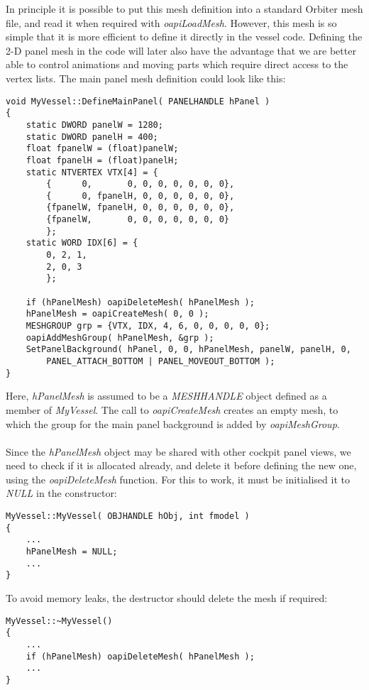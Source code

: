 \documentclass[Orbiter Developer Manual.tex]{subfiles}
\begin{document}
\noindent
In principle it is possible to put this mesh definition into a standard Orbiter mesh file, and read it when required with \textit{oapiLoadMesh}. However, this mesh is so simple that it is more efficient to define it directly in the vessel code. Defining the 2-D panel mesh in the code will later also have the advantage that we are better able to control animations and moving parts which require direct access to the vertex lists. The main panel mesh definition could look like this:

\begin{lstlisting}
void MyVessel::DefineMainPanel( PANELHANDLE hPanel )
{
	static DWORD panelW = 1280;
	static DWORD panelH = 400;
	float fpanelW = (float)panelW;
	float fpanelH = (float)panelH;
	static NTVERTEX VTX[4] = {
		{      0,       0, 0, 0, 0, 0, 0, 0},
		{      0, fpanelH, 0, 0, 0, 0, 0, 0},
		{fpanelW, fpanelH, 0, 0, 0, 0, 0, 0},
		{fpanelW,       0, 0, 0, 0, 0, 0, 0}
		};
	static WORD IDX[6] = {
		0, 2, 1,
		2, 0, 3
		};

	if (hPanelMesh) oapiDeleteMesh( hPanelMesh );
	hPanelMesh = oapiCreateMesh( 0, 0 );
	MESHGROUP grp = {VTX, IDX, 4, 6, 0, 0, 0, 0, 0};
	oapiAddMeshGroup( hPanelMesh, &grp );
	SetPanelBackground( hPanel, 0, 0, hPanelMesh, panelW, panelH, 0,
		PANEL_ATTACH_BOTTOM | PANEL_MOVEOUT_BOTTOM );
}
\end{lstlisting}

\noindent
Here, \textit{hPanelMesh} is assumed to be a \textit{MESHHANDLE} object defined as a member of \textit{MyVessel}. The call to \textit{oapiCreateMesh} creates an empty mesh, to which the group for the main panel background is added by \textit{oapiMeshGroup}.\\
\\
Since the \textit{hPanelMesh} object may be shared with other cockpit panel views, we need to check if it is allocated already, and delete it before defining the new one, using the \textit{oapiDeleteMesh} function. For this to work, it must be initialised it to \textit{NULL} in the constructor:

\begin{lstlisting}
MyVessel::MyVessel( OBJHANDLE hObj, int fmodel )
{
	...
	hPanelMesh = NULL;
	...
}
\end{lstlisting}

\noindent
To avoid memory leaks, the destructor should delete the mesh if required:

\begin{lstlisting}
MyVessel::~MyVessel()
{
	...
	if (hPanelMesh) oapiDeleteMesh( hPanelMesh );
	...
}
\end{lstlisting}
\end{document}
